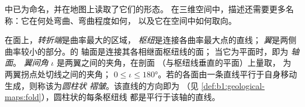 中已为命名，并在地图上读取了它们的形态。
在三维空间中，描述还需要更多名称：它在何处弯曲、弯曲程度如何，
以及它在空间中如何取向。

\begin{definition}\label{def:b1:faults-folds-fabrics:fold-elements}
在面上，\emph{转折端}是曲率最大的区域，
\emph{枢纽}是连接各曲率最大点的直线；
\emph{翼}是两侧曲率较小的部分。的
轴面是连接其各相继面枢纽线的面；
当它为平面时，即为
\emph{轴面}。
\emph{翼间角} $\iota$ 是两翼之间的夹角，在剖面
（与枢纽线垂直的平面）上量取，
为两翼拐点处切线之间的夹角；
$0 \le \iota \le \ang{180}$。若的各面由一条直线平行于自身移动生成，则称该为\emph{圆柱状
褶皱}。该直线的方向即为
（见
\cref{def:b1:geological-maps:fold}），圆柱状的每条枢纽线
都是平行于该轴的直线。
\end{definition}

